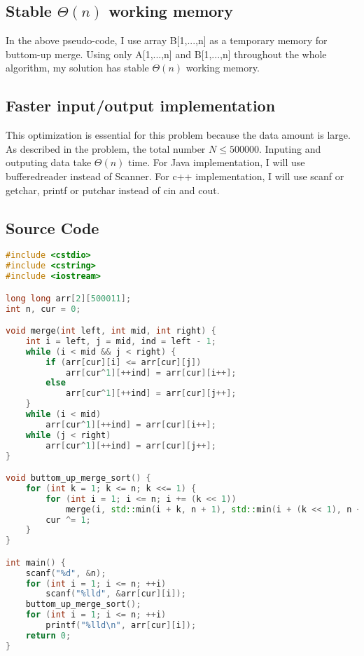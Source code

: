 \documentclass{report}
\begin{document}
\subsection{Stable $\Theta(n)$ working memory}

In the above pseudo-code, I use array B[1,...,n] as a temporary memory for buttom-up merge.
Using only A[1,...,n] and B[1,...,n] throughout the whole algorithm, my solution has stable $\Theta(n)$ working memory.

\subsection{Faster input/output implementation}

This optimization is essential for this problem because the data amount is large.
As described in the problem, the total number $N\leq 500000$. Inputing and outputing data take $\Theta(n)$ time.
For Java implementation, I will use bufferedreader instead of Scanner.
For c++ implementation, I will use scanf or getchar, printf or putchar instead of cin and cout.

\subsection{Source Code}

\begin{lstlisting}[language=C++, caption={Problem 1 c++ source code}]
#include <cstdio>
#include <cstring>
#include <iostream>

long long arr[2][500011];
int n, cur = 0;

void merge(int left, int mid, int right) {
    int i = left, j = mid, ind = left - 1;
    while (i < mid && j < right) {
        if (arr[cur][i] <= arr[cur][j])
            arr[cur^1][++ind] = arr[cur][i++];
        else
            arr[cur^1][++ind] = arr[cur][j++];
    }
    while (i < mid)
        arr[cur^1][++ind] = arr[cur][i++];
    while (j < right)
        arr[cur^1][++ind] = arr[cur][j++];
}

void buttom_up_merge_sort() {
    for (int k = 1; k <= n; k <<= 1) {
        for (int i = 1; i <= n; i += (k << 1))
            merge(i, std::min(i + k, n + 1), std::min(i + (k << 1), n + 1));
        cur ^= 1;
    }
}

int main() {
    scanf("%d", &n);
    for (int i = 1; i <= n; ++i)
        scanf("%lld", &arr[cur][i]);
    buttom_up_merge_sort();
    for (int i = 1; i <= n; ++i)
        printf("%lld\n", arr[cur][i]);
    return 0;
}
\end{lstlisting}
\end{document}
